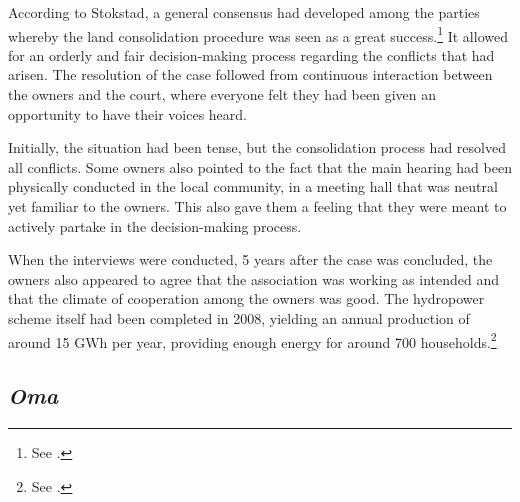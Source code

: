 According to Stokstad, a general consensus had developed among the parties whereby the land consolidation procedure was seen as a great success.\footnote{See \cite[39-41]{stokstad11}.} It allowed for an orderly and fair decision-making process regarding the conflicts that had arisen. The resolution of the case followed from continuous interaction between the owners and the court, where everyone felt they had been given an opportunity to have their voices heard. 

Initially, the situation had been tense, but the consolidation process had resolved all conflicts. Some owners also pointed to the fact that the main hearing had been physically conducted in the local community, in a meeting hall that was neutral yet familiar to the owners. This also gave them a feeling that they were meant to actively partake in the decision-making process. 

When the interviews were conducted, 5 years after the case was concluded, the owners also appeared to agree that the association was working as intended and that the climate of cooperation among the owners was good. The hydropower scheme itself had been completed in 2008, yielding an annual production of around 15 GWh per year, providing enough energy for around 700 households.\footnote{See \cite[41]{stokstad11}.}


\subsection{\emph{Oma}}\label{sec:6:4:2}

